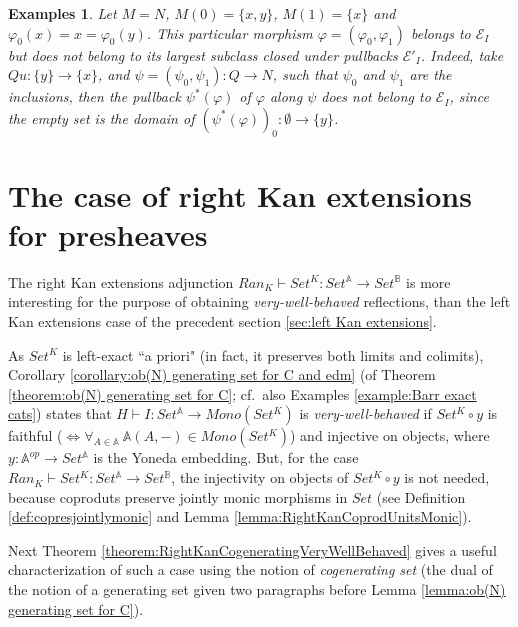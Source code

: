 \documentclass[12pt,a4paper]{amsart}
\newtheorem{examples}[example]{Examples}
\theoremstyle{definition}
\begin{document}
\begin{examples}
Let $M=N$, $M(0)=\{x,y\}$, $M(1)=\{x\}$ and $\varphi_0(x)=x=\varphi_0(y)$. This particular morphism $\varphi =(\varphi_0,\varphi_1)$ belongs to $\mathcal{E}_I$ but does not belong to its largest subclass closed under pullbacks $\mathcal{E}'_I$. Indeed, take $Qu:\{y\}\rightarrow\{x\}$, and $\psi =(\psi_0,\psi_1):Q\rightarrow N$, such that $\psi_0$ and $\psi_1$ are the inclusions, then the pullback $\psi^*(\varphi)$ of $\varphi$ along $\psi$ does not belong to $\mathcal{E}_I$, since the empty set is the domain of $(\psi^*(\varphi))_0:\emptyset\rightarrow\{y\}$.\end{examples}

\section{The case of right Kan extensions for presheaves}\label{sec:right Kan extensions}

The right Kan extensions adjunction $Ran_K\vdash Set^K :Set^\mathbb{A}\rightarrow Set^\mathbb{B}$ is more interesting for the purpose of obtaining \emph{very-well-behaved} reflections, than the left Kan extensions case of the precedent section \ref{sec:left Kan extensions}.

As $Set^K$ is left-exact ``a priori" (in fact, it preserves both limits and colimits), Corollary \ref{corollary:ob(N) generating set for C and edm} (of Theorem \ref{theorem:ob(N) generating set for C}; cf.\ also Examples \ref{example:Barr exact cats}) states that $H\vdash I:Set^\mathbb{A}\rightarrow Mono(Set^K)$ is \emph{very-well-behaved} if $Set^K\circ y$ is faithful ($\Leftrightarrow \forall_{A\in\mathbb{A}}\ \mathbb{A}(A,-)\in Mono(Set^K)$) and injective on objects, where $y:\mathbb{A}^{op}\rightarrow Set^\mathbb{A}$ is the Yoneda embedding. But, for the case $Ran_K\vdash Set^K :Set^\mathbb{A}\rightarrow Set^\mathbb{B}$, the injectivity on objects of $Set^K\circ y$ is not needed, because coproduts preserve jointly monic morphisms in $Set$ (see Definition \ref{def:copresjointlymonic} and Lemma \ref{lemma:RightKanCoprodUnitsMonic}).

Next Theorem \ref{theorem:RightKanCogeneratingVeryWellBehaved} gives a useful characterization of such a case using the notion of \emph{cogenerating set} (the dual of the notion of a generating set given two paragraphs before Lemma \ref{lemma:ob(N) generating set for C}).
\end{document}
